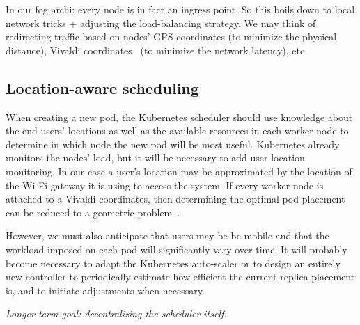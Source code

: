 \documentclass[letterpaper,twocolumn,10pt]{article}
\let\origref\ref
\def\ref#1{\textbf{\origref{#1}}}
\begin{document}
In our fog archi: every node is in fact an ingress point. So this
boils down to local network tricks + adjusting the load-balancing
strategy. We may think of redirecting traffic based on nodes' GPS
coordinates (to minimize the physical distance), Vivaldi
coordinates~\cite{vivaldi} (to minimize the network latency), etc.
\rm

\subsection{Location-aware scheduling}

When creating a new pod, the Kubernetes scheduler should use knowledge
about the end-users' locations as well as the available resources in
each worker node to determine in which node the new pod will be most
useful. Kubernetes already monitors the nodes' load, but it will be
necessary to add user location monitoring. In our case a user's
location may be approximated by the location of the Wi-Fi gateway it
is using to access the system. If every worker node is attached to a 
Vivaldi coordinates, then determining the optimal pod placement can be
reduced to a geometric problem~\cite{szymaniak2006}.

However, we must also anticipate that users may be be mobile and that
the workload imposed on each pod will significantly vary over time. It
will probably become necessary to adapt the Kubernetes auto-scaler or
to design an entirely new controller to periodically estimate how
efficient the current replica placement is, and to initiate
adjustments when necessary.



\emph{Longer-term goal: decentralizing the scheduler itself.}




\end{document}
